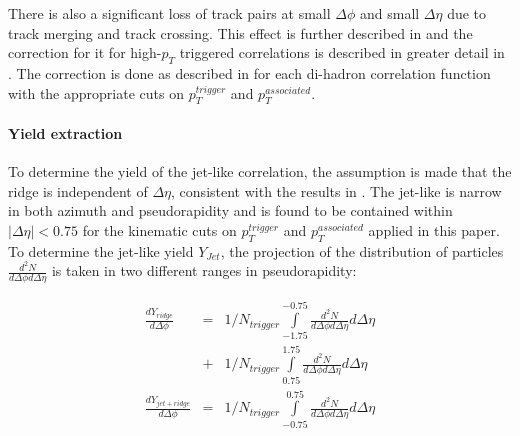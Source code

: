 \documentclass[aps,prc,twocolumn,groupedaddress,showpacs,preprintnumbers,amsmath,amssymb]{revtex4}
\newcommand{\pttrig}{$p_T^{trigger}$\xspace}
\newcommand{\ptassoc}{$p_T^{associated}$\xspace}
\newcommand{\pT}{$p_T$\xspace}
\newcommand{\highpT}{high-\pT}
\newcommand{\ridge}{ridge\xspace}
\newcommand{\dphi}{$\Delta\phi$\xspace}
\newcommand{\deta}{$\Delta\eta$\xspace}
\newcommand{\jl}{jet-like\xspace}
\newcommand{\jetridgeeta}{$|\Delta\eta| < 0.75$\xspace}
\newcommand{\roughly}{$\approx$\xspace}
\newcommand{\njet}{$Y_{Jet}$\xspace}
\begin{document}
There is also a significant loss of track pairs at small \dphi and small \deta due to track merging and track crossing.  This effect is further described in \cite{STARHBT} and the correction for it for \highpT triggered correlations is described in greater detail in \cite{PIDPaper}.
The correction is done as described in \cite{PIDPaper} for each di-hadron correlation function with the appropriate cuts on \pttrig and \ptassoc.
\paragraph*{Yield extraction}

To determine the yield of the jet-like correlation, the assumption is made that the \ridge is independent of \deta, consistent with the results in \cite{RidgePaper}.  The \jl is narrow in both azimuth and pseudorapidity and is found to be contained within \jetridgeeta for the kinematic cuts on \pttrig and \ptassoc applied in this paper.  To determine the \jl yield \njet, the projection of the distribution of particles $\frac{d^2N}{d\Delta\phi d\Delta\eta}$ is taken in two different ranges in pseudorapidity:

\begin{eqnarray}
  \frac{dY_{ridge}}{d\Delta\phi} & = & 1/N_{trigger} \int\limits_{-1.75}^{-0.75} \frac{d^2N}{d\Delta\phi d\Delta\eta} d\Delta\eta  \nonumber \\
   & + & 1/N_{trigger} \int\limits_{0.75}^{1.75} \frac{d^2N}{d\Delta\phi d\Delta\eta} d\Delta\eta\\ \label{ridgeeqtn1}
\frac{dY_{jet+ridge}}{d\Delta\phi} &= &1/N_{trigger} \int\limits_{-0.75}^{0.75} \frac{d^2N}{d\Delta\phi d\Delta\eta} d\Delta\eta\label{jeteqtn1}
\end{eqnarray}
\end{document}
